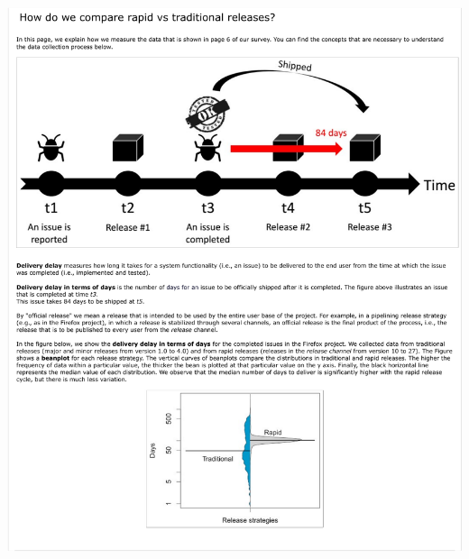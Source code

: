 \documentclass[
	12pt,				%
	openright,			%
	oneside,			%
	a4paper,			%
	french,				%
	spanish,			%
	brazil,				%
	english
	]{abntex2}
\newcounter{pt}
\newcounter{th}
\begin{document}
\begin{apendicesenv}
\includegraphics[width=.9\textwidth,keepaspectratio]{chapters/chapter5/appendix/ShiftIntegrationDelay.pdf}

\end{apendicesenv}
%
%
%
%
%
%
%
%
%
%

\printindex
\end{document}
